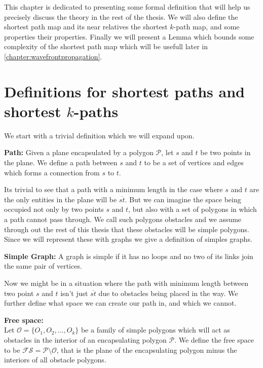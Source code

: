 \label{chapter:shortestpathmap}

This chapter is dedicated to presenting some formal definition that will help us
precisely discuss the theory in the rest of the thesis. We will also define the
shortest path map and its near relatives the shortest $k$-path map, and some properties
their properties. Finally we will present a Lemma which bounds some complexity of 
the shortest path map which will be usefull later in \ref{chapter:wavefrontpropagation}.

\section{Definitions for shortest paths and shortest $k$-paths}

We start with a trivial definition which we will expand upon.

\begin{mydef}\textbf{Path:}
Given a plane encapsulated by a polygon $\mathcal{P}$, let $s$ and $t$ be two
	points in the plane. We define a path between $s$ and $t$ to be a set of
	vertices and edges which forms a connection from $s$ to $t$.
\end{mydef}

Its trivial to see that a path with a minimum length in the case where $s$ and $t$
are the only entities in the plane will be $\overline{st}$. But we can imagine the
space being occupied not only by two points $s$ and $t$, but also with a set of 
polygons in which a path cannot pass through. We call such polygons obstacles and
we assume through out the rest of this thesis that these obstacles will be 
simple polygons. Since we will represent these with graphs we give a definition of 
simples graphs.

\begin{mydef}\textbf{Simple Graph:}
  A graph is simple if it has no loops and no two of its links join the same pair
  of vertices.
\end{mydef}

Now we might be in a situation where the path with minimum length between two point 
$s$ and $t$ isn't just $\overline{st}$ due to obstacles being placed in the way. We 
further define what space we can create our path in, and which we cannot.

\begin{mydef} 
	\textbf{Free space:}\\ 
	Let $\mathcal{O}=\{O_1,O_2,...,O_k\}$ be a
	family of simple polygons which will act as obstacles in the interior of an
	encapsulating polygon $\mathcal{P}$. We define the free space to be
	$\mathcal{FS}=\mathcal{P}\setminus\mathcal{O}$, that is the plane of the
	encapsulating polygon minus the interiors of all obstacle polygons.
\end{mydef}

